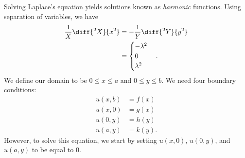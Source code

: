 \documentclass[10pt]{mypackage}
\begin{document}
\begin{example}
  Solving Laplace's equation yields solutions known as \textit{harmonic} functions. Using separation of variables, we have
  \begin{align*}
    \frac{1}{X}\diff{^2X}{x^2} &= - \frac{1}{Y}\diff{^2Y}{y^2}\\
                               &= \begin{cases}
                                 -\lambda^2\\
                                 0\\
                                 \lambda^2
                               \end{cases}.
  \end{align*}
  We define our domain to be $0\leq x \leq a$ and $0\leq y\leq b$. We need four boundary conditions:
  \begin{align*}
    u\left( x,b \right) &= f(x)\\
    u\left( x,0 \right) &= g(x)\\
    u\left( 0,y \right) &= h(y)\\
    u\left( a,y \right) &= k(y).
  \end{align*}
  However, to solve this equation, we start by setting $u\left( x,0 \right)$, $u\left( 0,y \right)$, and $u\left( a,y \right)$ to be equal to $0$.\newline


\end{example}
\end{document}
